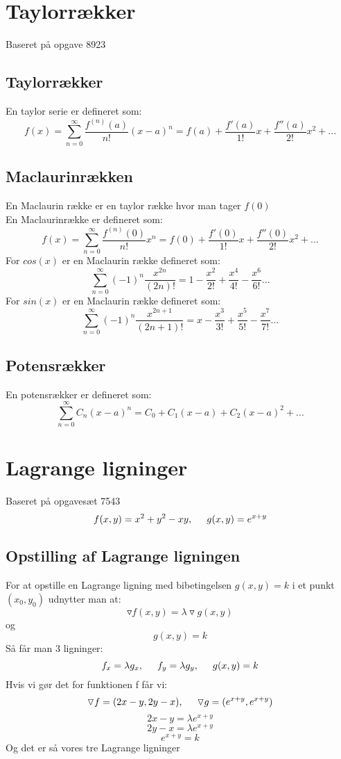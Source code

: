 \documentclass{article}
\begin{document}
\newpage

\section{Taylorrækker}
{\tiny Baseret på opgave 8923}

\subsection{Taylorrækker}
En taylor serie er defineret som:
$$f(x)=\sum\limits_{n=0}^{\infty}\frac{f^{(n)}(a)}{n!}(x-a)^n = f(a) + 
\frac{f'(a)}{1!}x+\frac{f''(a)}{2!}x^2+...$$

\subsection{Maclaurinrækken}
En Maclaurin række er en taylor række hvor man tager $f(0)$\\
En Maclaurinrække er defineret som:
$$f(x)=\sum\limits_{n=0}^{\infty}\frac{f^{(n)}(0)}{n!}x^n = f(0) + 
\frac{f'(0)}{1!}x+\frac{f''(0)}{2!}x^2+...$$
For $cos(x)$ er en Maclaurin række defineret som:
$$\sum\limits_{n=0}^{\infty}(-1)^n\frac{x^{2n}}{(2n)!}=1-\frac{x^2}{2!}+\frac{x^4}{4!}-\frac{x^6}{6!}...$$
For $sin(x)$ er en Maclaurin række defineret som:
$$\sum\limits_{n=0}^{\infty}(-1)^n\frac{x^{2n+1}}{(2n+1)!}=x-\frac{x^3}{3!}+\frac{x^5}{5!}-\frac{x^7}{7!}...$$

\subsection{Potensrækker}
En potensrækker er defineret som:
$$\sum\limits_{n=0}^{\infty}C_n(x-a)^n=C_0+C_1(x-a)+C_2(x-a)^2+...$$

\newpage

\section{Lagrange ligninger}
{\tiny Baseret på opgavesæt 7543}
$$f(x,y)=x^2+y^2-xy, \hspace{5mm} g(x,y)=e^{x+y}$$

\subsection{Opstilling af Lagrange ligningen}
For at opstille en Lagrange ligning med bibetingelsen $g(x,y)=k$ i et punkt 
$(x_0,y_0)$ udnytter man at:
$$\triangledown f(x,y) = \lambda \triangledown g(x,y)$$
og
$$g(x,y)=k$$
Så får man 3 ligninger:
$$f_x=\lambda g_x, \hspace{5mm} f_y=\lambda g_y, \hspace{5mm} g(x,y)=k$$
Hvis vi gør det for funktionen f får vi:
$$\triangledown f=(2x-y, 2y-x), \hspace{5mm} \triangledown g=(e^{x+y},e^{x+y})$$
$$2x-y=\lambda e^{x+y}$$
$$2y-x=\lambda e^{x+y}$$
$$e^{x+y}=k$$
Og det er så vores tre Lagrange ligninger
\end{document}
